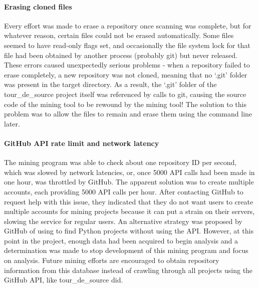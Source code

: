 \paragraph{Erasing cloned files}  Every effort was made to erase a repository once scanning was complete, but for whatever reason, certain files could not be erased automatically.  Some files seemed to have read-only flags set, and occasionally the file system lock for that file had been obtained by another process (probably git) but never released.  These errors caused unexpectedly serious problems - when a repository failed to erase completely, a new repository was not cloned, meaning that no `.git' folder was present in the target directory.  As a result, the `.git' folder of the tour\_de\_source project itself was referenced by calls to git, causing the source code of the mining tool to be rewound by the mining tool!  The solution to this problem was to allow the files to remain and erase them using the command line later.

\paragraph{GitHub API rate limit and network latency}
The mining program was able to check about one repository ID per second, which was slowed by network latencies, or, once 5000 API calls had been made in one hour, was throttled by GitHub.  The apparent solution was to create multiple accounts, each providing 5000 API calls per hour.  After contacting GitHub to request help with this issue, they indicated that they do not want users to create multiple accounts for mining projects because it can put a strain on their servers, slowing the service for regular users.  An alternative strategy was proposed by GitHub of using  to find Python projects without using the API.  However, at this point in the project, enough data had been acquired to begin analysis and a determination was made to stop development of this mining program and focus on analysis.  Future mining efforts are encouraged to obtain repository information from this database instead of crawling through all projects using the GitHub API, like tour\_de\_source did.


